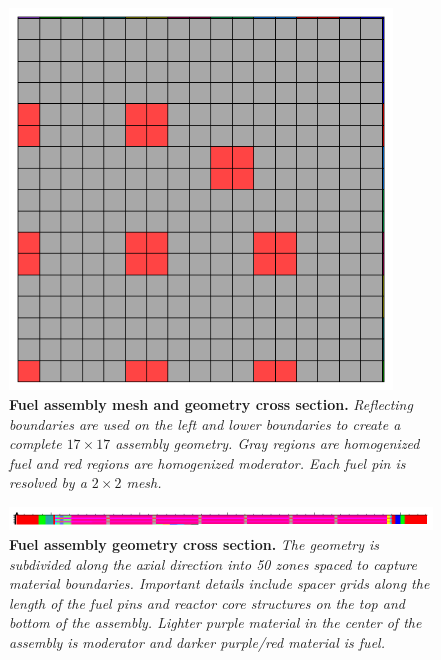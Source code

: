 \begin{figure}[t!]
  \begin{center}
    \includegraphics[width=4in]{chapters/spn_equations/problem3_radial_mat.png}
  \end{center}
  \caption{\textbf{Fuel assembly mesh and geometry cross section.}
    \textit{Reflecting boundaries are used on the left and lower
      boundaries to create a complete $17 \times 17$ assembly
      geometry. Gray regions are homogenized fuel and red regions are
      homogenized moderator. Each fuel pin is resolved by a $2 \times
      2$ mesh.}}
  \label{fig:problem3_radial_mat}
\end{figure}
\begin{figure}[t!]
  \begin{center}
    \includegraphics[width=6.0in]{chapters/spn_equations/problem3_axial_mat.png}
  \end{center}
  \caption{\textbf{Fuel assembly geometry cross section.} \textit{The
      geometry is subdivided along the axial direction into 50 zones
      spaced to capture material boundaries. Important details include
      spacer grids along the length of the fuel pins and reactor core
      structures on the top and bottom of the assembly. Lighter purple
      material in the center of the assembly is moderator and darker
      purple/red material is fuel.}}
  \label{fig:problem3_axial_mat}
\end{figure}
